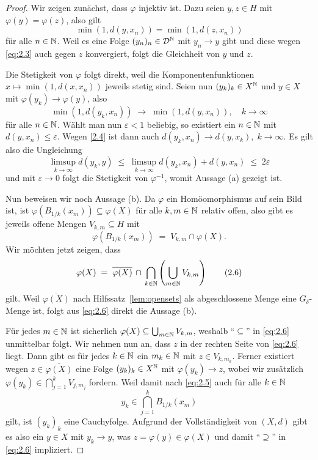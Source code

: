 \documentclass[../main/main.tex]{subfiles}
\begin{document}
	\begin{proof}
		Wir zeigen zunächst, dass $\varphi$ injektiv ist. 
		Dazu seien $y, z \in H$ mit $\varphi(y) = \varphi(z)$, also gilt
		\[\min(1, d(y, x_n)) = \min(1, d(z, x_n)) \label{eq:2.3} \tag{2.3}\]
		für alle $n \in \mathbb{N}$. Weil es eine Folge $(y_n)_n \in \mathcal{D}^{\mathbb{N}}$ mit 
		$y_n \to y$ gibt und diese wegen \eqref{eq:2.3} auch gegen $z$ 
		konvergiert, folgt die Gleichheit von $y$ und $z$.
		
		Die Stetigkeit von $\varphi$ folgt direkt, weil die 
		Komponentenfunktionen $x \mapsto \min(1, d(x, x_n))$ jeweils stetig sind. 
		Seien nun $(y_k)_k \in X^{\mathbb{N}}$ und $y \in X$ mit $\varphi(y_k) \to \varphi(y)$, 
		also
		\[\min(1, d(y_k, x_n)) \; \to \; \min(1, d(y, x_n)), 
		\quad k \to \infty \label{2.4} \tag{2.4}\]
		für alle $n \in \mathbb{N}$. Wählt man nun $\varepsilon < 1$ beliebig, 
		so existiert ein $n \in \mathbb{N}$ mit $d(y, x_n) \leq \varepsilon$. 
		Wegen \eqref{2.4} ist dann auch
		$d(y_k, x_n) \to d(y, x_k), \; k \to \infty$. Es gilt also die Ungleichung
		$$\limsup_{k \to \infty} d(y_k, y) \; \leq \; 
		\limsup_{k \to \infty} d(y_k, x_n) + d(y, x_n) \; \leq \; 2\varepsilon$$
		und mit $\varepsilon \to 0$ folgt die Stetigkeit von $\varphi^{-1}$, 
		womit Aussage (a) gezeigt ist.
		
		Nun beweisen wir noch Aussage (b). Da $\varphi$ ein Homöomorphismus auf sein 
		Bild ist, ist $\varphi(B_{1/k}(x_m)) \subseteq \varphi(X)$ für alle 
		$k, m \in \mathbb{N}$ relativ offen, also gibt es jeweils offene Mengen 
		$V_{k, m} \subseteq H$ mit
		\[\varphi(B_{1/k}(x_m)) \; = \; V_{k, m} 
		\cap \varphi(X) \text{.} \label{eq:2.5} \tag{2.5}\]
		Wir möchten jetzt zeigen, dass
		\[\varphi(X) \; = \; \overline{\varphi(X)} \, \cap \, 
		\bigcap_{k \in \mathbb{N}} \left( \bigcup_{m \in \mathbb{N}} V_{k, m} \right) 
		\label{eq:2.6} \tag{2.6}\]
		gilt. 
		Weil $\overline{\varphi(X)}$ nach Hilfssatz~\ref{lem:opensets} 
		als abgeschlossene Menge eine $G_\delta$-Menge ist, 
		folgt aus \eqref{eq:2.6} direkt die Aussage (b).
		
		Für jedes $m \in \mathbb{N}$ ist sicherlich $\varphi(X) \subseteq 
		\bigcup_{m \in \mathbb{N}} V_{k, m}$, weshalb \enquote{$\subseteq$} 
		in \eqref{eq:2.6} unmittelbar folgt.
		Wir nehmen nun an, dass $z$ in der rechten Seite von \eqref{eq:2.6} liegt. 
		Dann gibt es für jedes $k \in \mathbb{N}$ ein $m_k \in \mathbb{N}$ mit $z \in V_{k, m_k}$. 
		Ferner existiert wegen $z \in \overline{\varphi(X)}$ eine Folge $(y_k)_k \in X^{\mathbb{N}}$ 
		mit $\varphi(y_k) \to z$, wobei wir zusätzlich
		$\varphi(y_k) \in \bigcap_{j=1}^{k} V_{j, m_j}$
		fordern. Weil damit nach \eqref{eq:2.5} auch für alle $k \in \mathbb{N}$
		\[y_k \in \bigcap_{j=1}^{k} B_{1/k}(x_m)\]
		gilt, ist $(y_k)_k$ eine Cauchyfolge. Aufgrund der Vollständigkeit von 
		$(X, d)$ gibt es also ein $y \in X$ mit $y_k \to y$, was 
		$z = \varphi(y) \in \varphi(X)$ und damit \enquote{$\supseteq$} 
		in \eqref{eq:2.6} impliziert.
	\end{proof}
	
\end{document}
